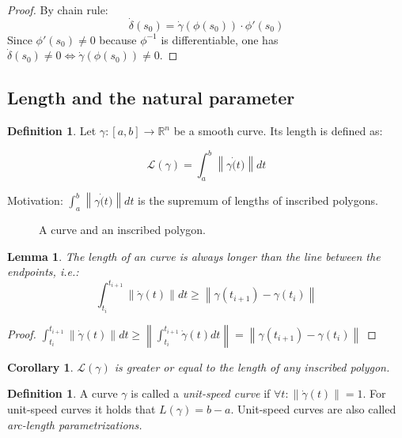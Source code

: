 \documentclass[a4paper,11pt,notitlepage,fullpage]{paper}
\theoremstyle{plain}
\newtheorem{lem}[thm]{Lemma}
\newtheorem{col}[thm]{Corollary}
\theoremstyle{definition}
\newtheorem{defn}[thm]{Definition} %
\begin{document}
\begin{proof} By chain rule: 
\begin{equation*}
\dot\delta(s_0) = \dot\gamma(\phi(s_0)) \cdot \phi'(s_0)
\end{equation*}
Since $\phi'(s_0) \neq 0$ because $\phi^{-1}$ is differentiable, one has $\dot\delta(s_0) \neq 0 \Leftrightarrow \dot\gamma(\phi(s_0)) \neq 0$. \end{proof}



\subsection{Length and the natural parameter}

\begin{defn}
Let $\gamma: [a,b] \to \mathbb R^n$ be a smooth curve. Its length is defined as:

\begin{equation*}
\mathcal L(\gamma) = \int_a^b \left\|\gamma\dot(t)\right\| dt
\end{equation*}
\end{defn}

Motivation: $\int_a^b \left\|\gamma\dot(t)\right\| dt $ is the supremum of lengths of inscribed polygons.

\begin{figure}[H]
\centering
\def\svgwidth{0.7\textwidth}

\caption{A curve and an inscribed polygon.}
\label{fig:inscribed-polygon}
\end{figure}


\begin{lem}
The length of an curve is always longer than the line between the endpoints, i.e.:
\begin{equation*}
\int_{t_i}^{t_{i+1}} \left\|\dot\gamma(t)\right\| dt \geq \left\|\gamma(t_{i+1}) - \gamma(t_i)\right\|
\end{equation*}
\end{lem}
\begin{proof} $\int_{t_i}^{t_{i+1}} \left\|\dot\gamma(t)\right\| dt \geq \left\|\int_{t_i}^{t_{i+1}} \dot\gamma(t) dt\right\| =  \left\|\gamma(t_{i+1}) - \gamma(t_i)\right\|$ \end{proof}

\begin{col}
$\mathcal L(\gamma)$ is greater or equal to the length of any inscribed polygon.
\end{col}


\begin{defn}
A curve $\gamma$ is called a \emph{unit-speed curve} if $\forall t : \left\|\dot\gamma(t)\right\| = 1$. For unit-speed curves it holds that $L(\gamma) = b-a$. Unit-speed curves are also called \emph{arc-length parametrizations.}
\end{defn}
\end{document}
